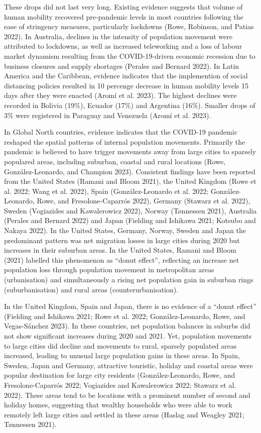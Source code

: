 \documentclass[
  11pt,
]{article}
\begin{document}
These drops did not last very long. Existing evidence suggests that
volume of human mobility recovered pre-pandemic levels in most countries
following the ease of stringency measures, particularly lockdowns (Rowe,
Robinson, and Patias 2022). In Australia, declines in the intensity of
population movement were attributed to lockdowns, as well as increased
teleworking and a loss of labour market dynamism resulting from the
COVID-19-driven economic recession due to business closures and supply
shortages (Perales and Bernard 2022). In Latin America and the
Caribbean, evidence indicates that the implemention of social distancing
policies resulted in 10 percenge decrease in human mobility levels 15
days after they were enacted (Aromí et al. 2023). The highest declines
were recorded in Bolivia (19\%), Ecuador (17\%) and Argentina (16\%).
Smaller drops of 3\% were registered in Paraguay and Venezuela (Aromí et
al. 2023).

In Global North countries, evidence indicates that the COVID-19 pandemic
reshaped the spatial patterns of internal population movements.
Primarily the pandemic is believed to have trigger movements away from
large cities to sparsely populared areas, including suburban, coastal
and rural locations (Rowe, González-Leonardo, and Champion 2023).
Consistent findings have been reported from the United States (Ramani
and Bloom 2021), the United Kingdom (Rowe et al. 2022; Wang et al.
2022), Spain (González-Leonardo et al. 2022; González-Leonardo, Rowe,
and Fresolone-Caparrós 2022), Germany (Stawarz et al. 2022), Sweden
(Vogiazides and Kawalerowicz 2022), Norway (Tønnessen 2021), Australia
(Perales and Bernard 2022) and Japan (Fielding and Ishikawa 2021;
Kotsubo and Nakaya 2022). In the United States, Germany, Norway, Sweden
and Japan the predominant pattern was net migration losses in large
cities during 2020 but increases in their suburban areas. In the United
States, Ramani and Bloom (2021) labelled this phenomenon as ``donut
effect'', reflecting an increase net population loss through population
movement in metropolitan areas (urbanisation) and simultaneously a
rising net population gain in suburban rings (suburbanisation) and rural
areas (counterurbanisation).

In the United Kingdom, Spain and Japan, there is no evidence of a
``donut effect'' (Fielding and Ishikawa 2021; Rowe et al. 2022;
González-Leonardo, Rowe, and Vegas-Sánchez 2023). In these countries,
net population balances in suburbs did not show significant increases
during 2020 and 2021. Yet, population movements to large cities did
decline and movements to rural, sparsely populated areas increased,
leading to unusual large population gains in these areas. In Spain,
Sweden, Japan and Germany, attractive touristic, holiday and coastal
areas were popular destination for large city residents
(González-Leonardo, Rowe, and Fresolone-Caparrós 2022; Vogiazides and
Kawalerowicz 2022; Stawarz et al. 2022). These areas tend to be
locations with a prominent number of second and holiday homes,
suggesting that wealthy households who were able to work remotely left
large cities and settled in these areas (Haslag and Weagley 2021;
Tønnessen 2021).
\end{document}

